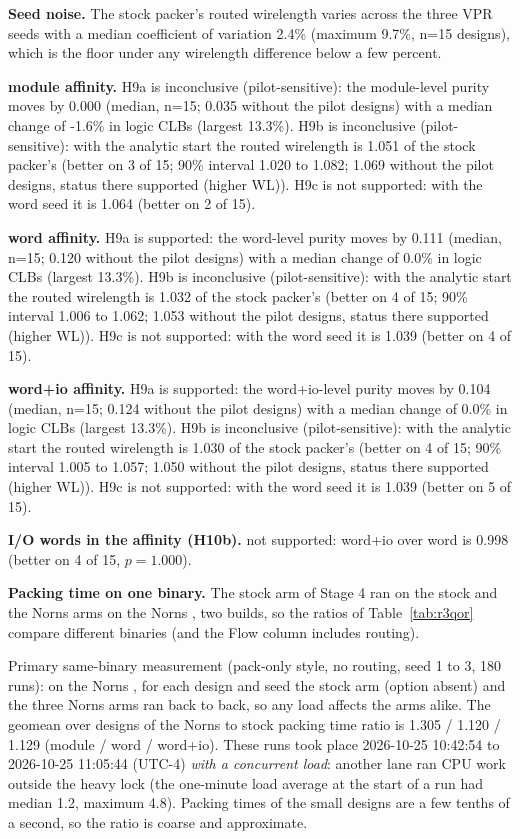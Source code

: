 \textbf{Seed noise.} The stock packer's routed wirelength varies across the three VPR seeds with a median coefficient of variation
2.4\% (maximum 9.7\%, n=15 designs), which is the floor under any wirelength difference below a few percent.

\textbf{module affinity.} H9a is inconclusive (pilot-sensitive): the module-level purity moves by 0.000 (median, n=15; 0.035 without the pilot designs) with a median change of -1.6\% in logic CLBs (largest 13.3\%). H9b is inconclusive (pilot-sensitive): with the analytic start the routed wirelength is 1.051 of the stock packer's (better on 3 of 15; 90\% interval 1.020 to 1.082; 1.069 without the pilot designs, status there supported (higher WL)). H9c is not supported: with the word seed it is 1.064 (better on 2 of 15).

\textbf{word affinity.} H9a is supported: the word-level purity moves by 0.111 (median, n=15; 0.120 without the pilot designs) with a median change of 0.0\% in logic CLBs (largest 13.3\%). H9b is inconclusive (pilot-sensitive): with the analytic start the routed wirelength is 1.032 of the stock packer's (better on 4 of 15; 90\% interval 1.006 to 1.062; 1.053 without the pilot designs, status there supported (higher WL)). H9c is not supported: with the word seed it is 1.039 (better on 4 of 15).

\textbf{word+io affinity.} H9a is supported: the word+io-level purity moves by 0.104 (median, n=15; 0.124 without the pilot designs) with a median change of 0.0\% in logic CLBs (largest 13.3\%). H9b is inconclusive (pilot-sensitive): with the analytic start the routed wirelength is 1.030 of the stock packer's (better on 4 of 15; 90\% interval 1.005 to 1.057; 1.050 without the pilot designs, status there supported (higher WL)). H9c is not supported: with the word seed it is 1.039 (better on 5 of 15).

\textbf{I/O words in the affinity (H10b).} not supported: word+io over word is 0.998 (better on 4 of 15, $p=1.000$).

\textbf{Packing time on one binary.} The stock arm of Stage 4 ran on the stock  and the Norns arms on the
Norns , two builds, so the ratios of Table~\ref{tab:r3qor} compare different binaries (and the Flow column includes
routing).

Primary same-binary measurement (pack-only style, no routing, seed 1 to 3, 180 runs): on the Norns
, for each design and seed the stock arm (option absent) and the three Norns arms ran back to back, so any load affects the arms alike.
The geomean over designs of the Norns to stock packing time ratio is 1.305 / 1.120 / 1.129 (module / word / word+io). These runs took place
2026-10-25 10:42:54 to 2026-10-25 11:05:44 (UTC-4) \emph{with a concurrent load}: another lane ran CPU work outside the heavy lock (the one-minute load
average at the start of a run had median 1.2, maximum 4.8). Packing times of the small designs are a few tenths of a second,
so the ratio is coarse and approximate.

